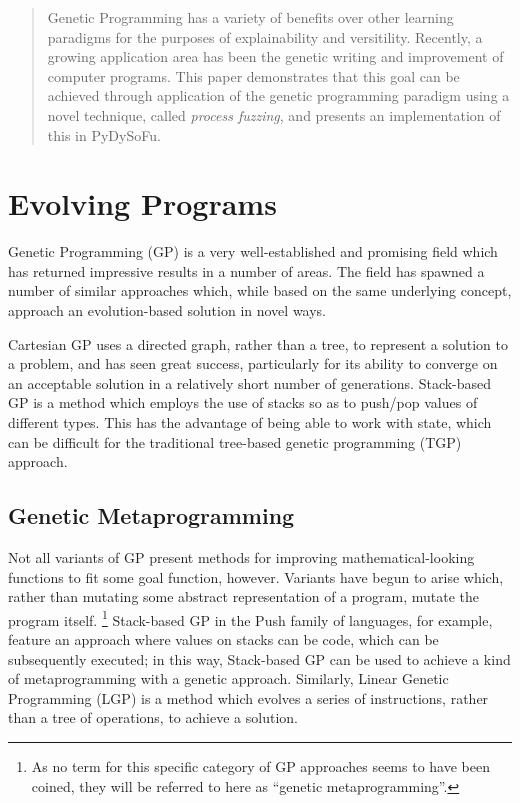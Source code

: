 \documentclass[draft,12pt]{llncs}   %
\begin{document}
\maketitle

\begin{abstract}
  Genetic Programming has a variety of benefits over other learning paradigms
  for the purposes of explainability and versitility. Recently, a growing
  application area has been the genetic writing and improvement of computer
  programs. This paper demonstrates that this goal can be achieved through
  application of the genetic programming paradigm using a novel technique,
  called \emph{process fuzzing}, and presents an implementation of this in
  PyDySoFu.
\end{abstract}


\section{Evolving Programs}
Genetic Programming (GP) is a very well-established and promising field which
has returned impressive results in a number of areas. The field has spawned a
number of similar approaches which, while based on the same underlying concept,
approach an evolution-based solution in novel ways.\par

Cartesian GP\cite{miller1999empirical,miller2011cartesian} uses a directed
graph, rather than a tree, to represent a solution to a problem, and has seen
great success, particularly for its ability to converge on an acceptable
solution in a relatively short number of generations. Stack-based
GP\cite{perkis1994stack} is a method which employs the use of stacks so as to
push/pop values of different types. This has the advantage of being able to work
with state, which can be difficult for the traditional tree-based genetic
programming (TGP) approach.\par

\subsection{Genetic Metaprogramming}
Not all variants of GP present methods for improving mathematical-looking
functions to fit some goal function, however. Variants have begun to arise
which, rather than mutating some abstract representation of a program, mutate
the program itself. \footnote{As no term for this specific category of GP
  approaches seems to have been coined, they will be referred to here as
  ``genetic metaprogramming''.} Stack-based GP in the Push family of
languages\cite{spector2001autoconstructive}, for example, feature an approach
where values on stacks can be code, which can be subsequently executed; in this
way, Stack-based GP can be used to achieve a kind of metaprogramming with a
genetic approach. Similarly, Linear Genetic Programming\cite{brameier2007linear}
(LGP) is a method which evolves a series of instructions, rather than a tree of
operations, to achieve a solution.\par
\end{document}

